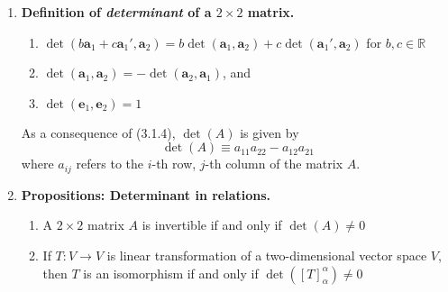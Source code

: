 \documentclass[oneside, 12pt]{book}
\newcommand{\settag}[1]{\renewcommand{\theenumi}{#1}}
\newcommand{\R}{\mathbb{R}}
\newcommand{\tbf}[1]{\textbf{#1}}
\newcommand{\trans}[3]{$#1:#2\rightarrow{}#3$}
\newcommand{\map}[3]{\text{$\left[#1\right]_{#2}^{#3}$}}
\newcommand{\para}[1]{\item \tbf{#1}}
\newcommand{\va}{\mathbf{a}}
\newcommand{\ve}{\mathbf{e}}
\begin{document}
\begin{enumerate}
    \settag{3.1.5}
    \para{Definition of \textit{determinant} of a $2 \times 2$ matrix.}
    \begin{enumerate}
        \item $\det(b\va_1 + c\va_1', \va_2) = b\det(\va_1, \va_2) + c\det(\va_1', \va_2)$ for $b, c\in \R$
        \item $\det(\va_1, \va_2) = -\det(\va_2, \va_1)$, and
        \item $\det(\ve_1, \ve_2) = 1$
    \end{enumerate}
    As a consequence of (3.1.4), $\det(A)$ is given by
    \begin{equation*}
        \det(A)\equiv a_{11}a_{22} - a_{12}a_{21}
    \end{equation*}
    where $a_{ij}$ refers to the $i$-th row, $j$-th column of the matrix $A$.
    
    \settag{3.1.6}
    \para{Propositions: Determinant in relations.}
    \begin{enumerate}
        \item A $2 \times 2$ matrix $A$ is invertible if and only if $\det(A)\neq 0$
        \item If \trans{T}{V}{V} is linear transformation of a two-dimensional vector space $V$, then $T$ is an isomorphism if and only if $\det(\map{T}{\alpha}{\alpha}) \neq 0$
    \end{enumerate}
\end{enumerate}
\end{document}
